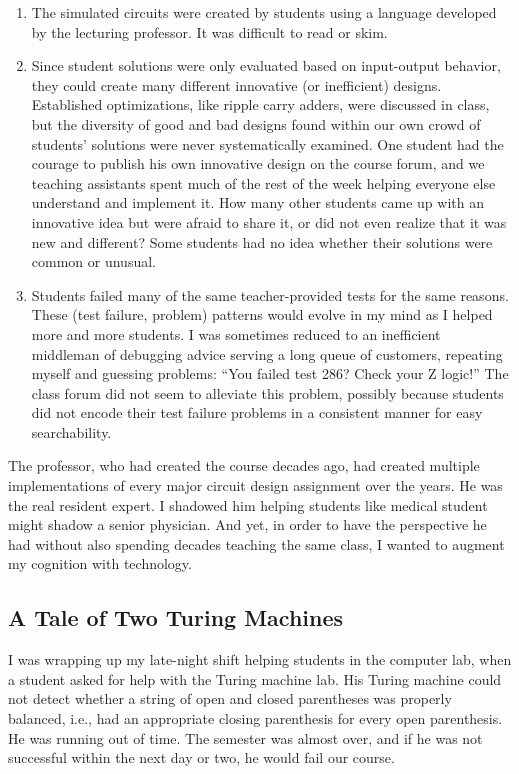 \begin{enumerate}
\item The simulated circuits were created by students using a language developed by the lecturing professor. It was difficult to read or skim.
\item Since student solutions were only evaluated based on input-output behavior, they could create many different innovative (or inefficient) designs. Established optimizations, like ripple carry adders, were discussed in class, but the diversity of good and bad designs found within our own crowd of students' solutions were never systematically examined. One student had the courage to publish his own innovative design on the course forum, and we teaching assistants spent much of the rest of the week helping everyone else understand and implement it. How many other students came up with an innovative idea but were afraid to share it, or did not even realize that it was new and different? Some students had no idea whether their solutions were common or unusual.
\item Students failed many of the same teacher-provided tests for the same reasons. These (test failure, problem) patterns would evolve in my mind as I helped more and more students. I was sometimes reduced to an inefficient middleman of debugging advice serving a long queue of customers, repeating myself and guessing problems: ``You failed test 286? Check your Z logic!'' The class forum did not seem to alleviate this problem, possibly because students did not encode their test failure problems in a consistent manner for easy searchability.
\end{enumerate}

The professor, who had created the course decades ago, had created multiple implementations of every major circuit design assignment over the years. He was the real resident expert. I shadowed him helping students like medical student might shadow a senior physician. And yet, in order to have the perspective he had without also spending decades teaching the same class, I wanted to augment my cognition with technology. 

\subsection{A Tale of Two Turing Machines}

I was wrapping up my late-night shift helping students in the computer lab, when a student asked for help with the Turing machine lab. His Turing machine could not detect whether a string of open and closed parentheses was properly balanced, i.e., had an appropriate closing parenthesis for every open parenthesis. He was running out of time. The semester was almost over, and if he was not successful within the next day or two, he would fail our course.

